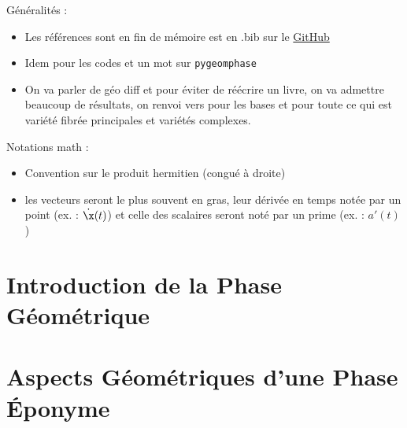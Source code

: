 Généralités :
\begin{itemize}
	
	\item Les références sont en fin de mémoire est en .bib sur le \href{https://github.com/GregoireDoat/StageM2}{GitHub}
	
	\item Idem pour les codes et un mot sur \texttt{pygeomphase}

	\item On va parler de géo diff et pour éviter de réécrire un livre, on va admettre beaucoup de résultats, on renvoi vers \cite{lafontaine_introduction_2015,do_carmo_riemannian_1992} pour les bases et  \cite{nakahara_geometry_2003,pham_mau_quan_introduction_1969,ballmann_lectures_2006} pour toute ce qui est variété fibrée principales et variétés complexes.
	
\end{itemize}
\skipl

Notations math :
\begin{itemize}
	
	\item Convention sur le produit hermitien (congué à droite)
	
	\item les vecteurs seront le plus souvent en gras, leur dérivée en temps notée par un point (ex. : $\dot{\x}(t)$) et celle des scalaires seront noté par un prime (ex. : $a'(t)$)
	
\end{itemize}
\skipl



\newpage








\part{Introduction de la Phase Géométrique} \label{part:param_instant} 




\part{Aspects Géométriques d'une Phase Éponyme} \label{part:phase_geo} 




